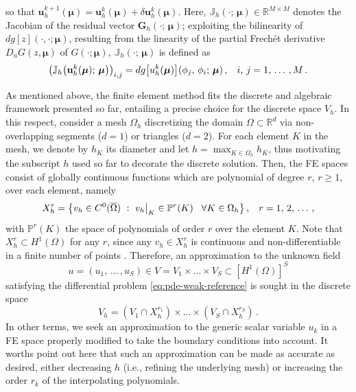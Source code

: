 \documentclass[12pt, a4paper, twoside, openright]{report}
\numberwithin{equation}{chapter}
\theoremstyle{theorem}
\theoremstyle{definition}
\theoremstyle{remark}
\theoremstyle{proposition}
\numberwithin{figure}{chapter}
\newcommand{\bg}[1]{\boldsymbol{#1}}
\begin{document}
		so that $\mathbf{u}^{k+1}_h(\bg{\mu}) = \mathbf{u}^k_h(\bg{\mu}) + \delta \mathbf{u}^k_h(\bg{\mu})$. Here, $\mathbb{J}_h(\cdot; \, \bg{\mu}) \in \mathbb{R}^{M \times M}$ denotes the Jacobian of the residual vector $\mathbf{G}_h(\cdot; \, \bg{\mu})$; exploiting the bilinearity of $dg[z](\cdot, \cdot; \bg{\mu})$, resulting from the linearity of the partial Frech\'et derivative $D_u G(z, \bg{\mu})$ of $G(\cdot; \bg{\mu})$, $\mathbb{J}_h(\cdot; \, \bg{\mu})$ is defined as
		\begin{equation}
			\left( \mathbb{J}_h \big( \mathbf{u}^k_h(\bg{\mu}); \, \bg{\mu} \big) \right)_{i,j} = dg\big[u^k_h(\bg{\mu})\big](\phi_j, \, \phi_i; \, \bg{\mu}) \, , \hspace*{0.3cm} i, \, j = 1, \, \ldots \, , M \, .
		\end{equation}
		
		As mentioned above, the finite element method fits the discrete and algebraic framework presented so far, entailing a precise choice for the discrete space $V_h$. In this respect, consider a mesh $\Omega_h$ discretizing the domain $\Omega \subset \mathbb{R}^d$ via non-overlapping segments ($d = 1$) or triangles ($d = 2$). For each element $K$ in the mesh, we denote by $h_K$ its diameter and let $h = \max_{K \in \Omega_h} h_K$, thus motivating the subscript $h$ used so far to decorate the discrete solution. Then, the FE spaces consist of globally continuous functions which are polynomial of degree $r$, $r \geq 1$, over each element, namely
		\begin{equation*}
			X_h^r = \big\lbrace v_h \in C^0 ( \overline{\Omega} ) ~ : ~ v_h \big\rvert_K \in \mathbb{P}^r(K) \hspace*{0.3cm} \forall K \in \Omega_h \big\rbrace \, , \hspace*{0.3cm} r = 1, \, 2, \, \ldots \, ,
		\end{equation*}
		with $\mathbb{P}^r(K)$ the space of polynomials of order $r$ over the element $K$. Note that $X_h^r \subset H^1(\Omega)$ for any $r$, since any $v_h \in X_h^r$ is continuous and non-differentiable in a finite number of points \cite{QMN15}. Therefore, an approximation to the unknown field
		\begin{equation}
			\label{eq:notation-1}
			u = \left( u_1, \, \ldots \, , u_S \right) \in V = V_1 \times \ldots \times V_S \subset \left[ H^1(\Omega) \right]^S
		\end{equation}  
		satisfying the differential problem \eqref{eq:pde-weak-reference} is sought in the discrete space
		\begin{equation}
			\label{eq:notation-2}
			V_h = \left( V_1 \cap X_h^{r_1} \right) \times \ldots \times \left( V_S \cap X_h^{r_S} \right) \, .
		\end{equation}
		In other terms, we seek an approximation to the generic scalar variable $u_k$ in a FE space properly modified to take the boundary conditions into account. It worths point out here that such an approximation can be made as accurate as desired, either decreasing $h$ (i.e., refining the underlying mesh) or increasing the order $r_k$ of the interpolating polynomials. 
		
\end{document}
